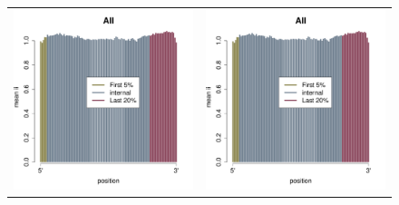 \documentclass[12pt,letterpaper]{article}
\begin{document}
\begin{figure}
\begin{tabular}{c c}
\includegraphics[scale=0.4, page=1]{insertion-position-bias.pdf}&
\includegraphics[scale=0.4, page=2]{insertion-position-bias.pdf}\\

\end{tabular}
\end{figure}
\end{document}
